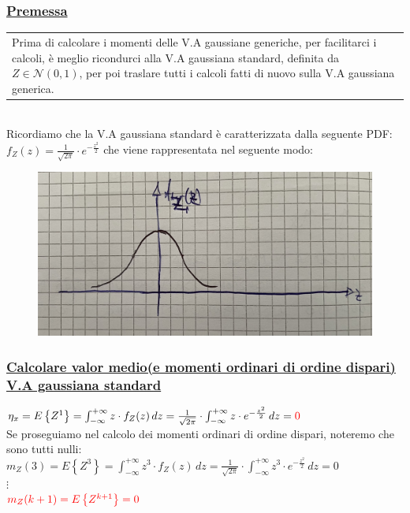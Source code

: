\documentclass{article}
\begin{document}
\subsubsection{\underline{Premessa}}
\begin{tabular}{|p{13cm}}
Prima di calcolare i momenti delle V.A gaussiane generiche, per facilitarci i calcoli, è meglio ricondurci alla V.A gaussiana standard, definita da $Z \in \mathcal{N}(0,1)$, per poi traslare tutti i calcoli fatti di nuovo sulla V.A gaussiana generica.
\end{tabular} \\
Ricordiamo che la V.A gaussiana standard è caratterizzata dalla seguente PDF: $f_Z(z) = \frac{1}{\sqrt{2 \pi }} \cdot e^{-\frac{z^2}{2}}$ che viene rappresentata nel seguente modo:
\begin{figure}[ht]
\centering
\includegraphics[scale=0.10]{images/63.V.A.GaussStand.jpeg}
\end{figure} 
\subsubsection{\underline{Calcolare valor medio(e momenti ordinari di ordine dispari) V.A gaussiana standard}}
$\eta_x = E \left\{ Z^1 \right\} = \int_{-\infty}^{+\infty} z \cdot f_Z(z) \,dz = \frac{1}{\sqrt{2\pi}} \cdot \int_{-\infty}^{+\infty} z \cdot e^{- \frac{z^2}{2}} \,dz = \color{red} 0$ \\
Se proseguiamo nel calcolo dei momenti ordinari di ordine dispari, noteremo che sono tutti nulli: \\
$m_Z(3) = E \left\{ Z^3 \right\} = \int_{-\infty}^{+\infty} z^3 \cdot f_Z(z) \,dz = \frac{1}{\sqrt{2\pi}} \cdot \int_{-\infty}^{+\infty} z^3 \cdot e^{- \frac{z^2}{2}} \,dz = 0$ \\
$\vdots$ \\
$\color{red} m_Z(k+1) = E \left\{Z^{k+1}\right\} = 0$
\end{document}
